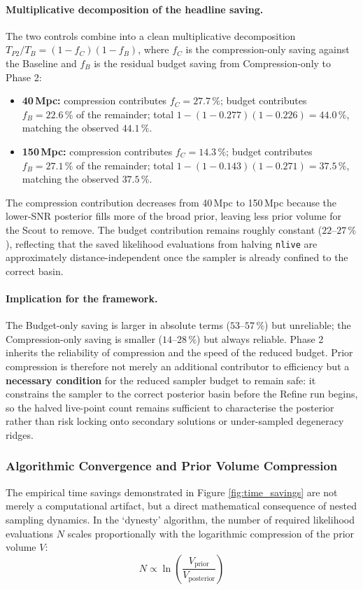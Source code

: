 \documentclass[12pt]{article}
\begin{document}
\paragraph{Multiplicative decomposition of the headline saving.}
The two controls combine into a clean multiplicative decomposition $T_{P2}/T_B = (1 - f_C)(1 - f_B)$, where $f_C$ is the compression-only saving against the Baseline and $f_B$ is the residual budget saving from Compression-only to Phase 2:
\begin{itemize}
    \item \textbf{40\,Mpc:} compression contributes $f_C = 27.7\,\%$; budget contributes $f_B = 22.6\,\%$ of the remainder; total $1 - (1 - 0.277)(1 - 0.226) = 44.0\,\%$, matching the observed $44.1\,\%$.
    \item \textbf{150\,Mpc:} compression contributes $f_C = 14.3\,\%$; budget contributes $f_B = 27.1\,\%$ of the remainder; total $1 - (1 - 0.143)(1 - 0.271) = 37.5\,\%$, matching the observed $37.5\,\%$.
\end{itemize}
The compression contribution decreases from 40\,Mpc to 150\,Mpc because the lower-SNR posterior fills more of the broad prior, leaving less prior volume for the Scout to remove. The budget contribution remains roughly constant ($22$--$27\,\%$), reflecting that the saved likelihood evaluations from halving \texttt{nlive} are approximately distance-independent once the sampler is already confined to the correct basin.
 
\paragraph{Implication for the framework.}
The Budget-only saving is larger in absolute terms ($53$--$57\,\%$) but unreliable; the Compression-only saving is smaller ($14$--$28\,\%$) but always reliable. Phase 2 inherits the reliability of compression and the speed of the reduced budget. Prior compression is therefore not merely an additional contributor to efficiency but a \textbf{necessary condition} for the reduced sampler budget to remain safe: it constrains the sampler to the correct posterior basin before the Refine run begins, so the halved live-point count remains sufficient to characterise the posterior rather than risk locking onto secondary solutions or under-sampled degeneracy ridges.
 
 

\subsubsection{Algorithmic Convergence and Prior Volume Compression}
The empirical time savings demonstrated in Figure \ref{fig:time_savings} are not merely a computational artifact, but a direct mathematical consequence of nested sampling dynamics. In the `dynesty' algorithm, the number of required likelihood evaluations $N$ scales proportionally with the logarithmic compression of the prior volume $V$:
\begin{equation}
    N \propto \ln\left(\frac{V_{\text{prior}}}{V_{\text{posterior}}}\right)
\end{equation}
\end{document}
